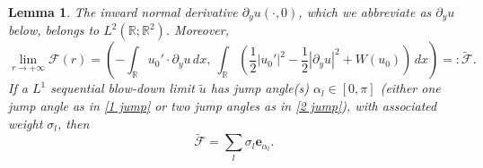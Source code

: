 \documentclass[leqno,11pt]{amsart}
\let\pa=\partial
\let\al=\alpha
\let\f=\frac
\let\pa=\partial
\def\tcf{\widetilde{\mathcal{F}}}
\newtheorem{lemma}[theorem]{Lemma}
\theoremstyle{remark}
\newcommand{\BR}{\mathbb{R}}
\begin{document}
\begin{lemma}\label{lem: bdy flux}
    The inward normal derivative $\pa_y u(\cdot, 0)$, which we abbreviate as $\pa_y u$ below, belongs to $L^2(\BR;\BR^2)$. Moreover,
    \begin{equation}
        \label{conv bdy flux} \lim\limits_{r\to+\infty} \mathcal{F}(r)= \left( -\int_{\BR} u_0'\cdot \pa_yu\,dx,\ \int_\BR (\f12|u_0'|^2-\f12|\pa_y u|^2+W(u_0))\,dx \right)=: \widetilde{\mathcal{F}}.
    \end{equation}
    If a $L^1$ sequential blow-down limit $\tilde{u}$ has jump angle(s) $\al_l\in[0,\pi]$ (either one jump angle as in \eqref{1 jump} or two jump angles as in \eqref{2 jump}), with associated weight $\sigma_l$, then 
    \begin{equation}\label{tcf}
        \tcf=\sum_l \sigma_l \mathbf{e}_{\al_l}.
    \end{equation}
\end{lemma}
\end{document}
